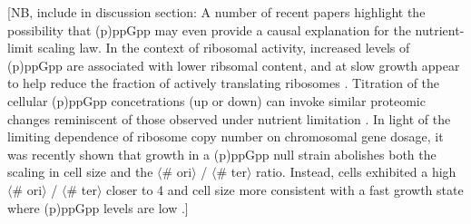 [NB, include in
discussion section: A number of recent papers highlight the possibility that
(p)ppGpp may even provide a causal explanation for the nutrient-limit scaling
law. In the context of ribosomal activity, increased levels of (p)ppGpp are
associated with lower ribsomal content, and at slow growth appear to help reduce
the fraction of actively translating ribosomes \citep{dai2016, dai2018}.
Titration of the cellular (p)ppGpp concetrations (up or down) can invoke similar
proteomic changes reminiscent of those observed under nutrient limitation
\citep{zhu2019}. In light of the limiting dependence of ribosome copy number on
chromosomal gene dosage, it was recently shown that growth in a (p)ppGpp  null
strain abolishes both the scaling in cell size  and the $\langle$\# ori$\rangle$
/ $\langle$\# ter$\rangle$ ratio. Instead, cells exhibited a high $\langle$\#
ori$\rangle$ / $\langle$\# ter$\rangle$ closer to 4 and cell size more
consistent with a fast growth state where (p)ppGpp levels are low
\citep{fernandezcoll2020}.]
